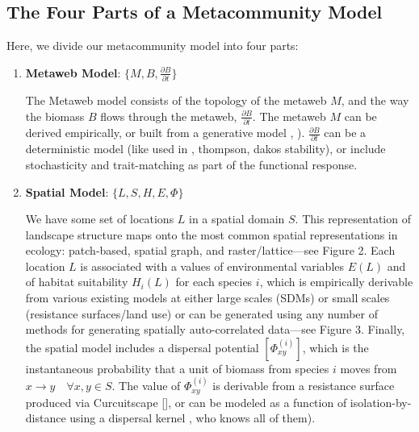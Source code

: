\documentclass[]{article}
\begin{document}
\hypertarget{the-four-parts-of-a-metacommunity-model}{%
\subsection{The Four Parts of a Metacommunity
Model}\label{the-four-parts-of-a-metacommunity-model}}

Here, we divide our metacommunity model into four parts:

\begin{enumerate}
\def\labelenumi{\arabic{enumi}.}
\item
  \textbf{Metaweb Model}: \(\{M, B, \frac{\partial B}{\partial t}\}\)

  The Metaweb model consists of the topology of the metaweb \(M\), and
  the way the biomass \(B\) flows through the metaweb,
  \(\frac{\partial B}{\partial t}\). The metaweb \(M\) can be derived
  empirically, or built from a generative model
  \citep{williams_martinez}, \citep{allesina}).
  \(\frac{\partial B}{\partial t}\) can be a deterministic model (like
  used in \citep{delmas}, thompson, dakos stability), or include
  stochasticity and trait-matching as part of the functional response.
\item
  \textbf{Spatial Model}: \(\{L, S, H, E, \Phi \}\)

  We have some set of locations \(L\) in a spatial domain \(S\). This
  representation of landscape structure maps onto the most common
  spatial representations in ecology: patch-based, spatial graph, and
  raster/lattice---see Figure 2. Each location \(L\) is associated with
  a values of environmental variables \(E(L)\) and of habitat
  suitability \(H_i(L)\) for each species \(i\), which is empirically
  derivable from various existing models at either large scales (SDMs)
  or small scales (resistance surfaces/land use) or can be generated
  using any number of methods for generating spatially auto-correlated
  data---see Figure 3. Finally, the spatial model includes a dispersal
  potential \([\Phi^{(i)}_{xy}]\), which is the instantaneous
  probability that a unit of biomass from species \(i\) moves from
  \(x \to y \quad \forall x,y \in S\). The value of \(\Phi^{(i)}_{xy}\)
  is derivable from a resistance surface produced via Curcuitscape
  {[}\citep{cite}{]}, or can be modeled as a function of
  isolation-by-distance using a dispersal kernel \citep{hanski}, who
  knows all of them).


\end{enumerate}
\end{document}
